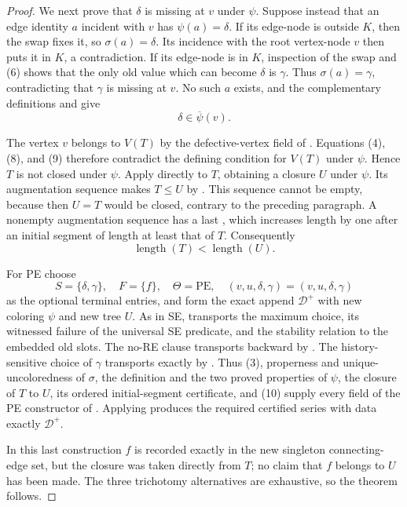 \begin{proof}
We next prove that \(\delta\) is missing at \(v\) under \(\psi\).
Suppose instead that an edge identity \(a\) incident with \(v\) has
\(\psi(a)=\delta\).  If its edge-node is outside \(K\), then the swap
fixes it, so \(\sigma(a)=\delta\).  Its incidence with the root
vertex-node \(v\) then puts it in \(K\), a contradiction.  If its
edge-node is in \(K\), inspection of the swap and (6) shows that the only
old value which can become \(\delta\) is \(\gamma\).  Thus
\(\sigma(a)=\gamma\), contradicting that \(\gamma\) is missing at
\(v\).  No such \(a\) exists, and the complementary definitions
 and  give
\[
                    \delta\in\overline\psi(v).                 \tag{9}
\]

The vertex \(v\) belongs to \(V(T)\) by the defective-vertex field of
.  Equations (4), (8), and (9) therefore
contradict the defining condition  for
\(V(T)\) under \(\psi\).  Hence \(T\) is not closed under \(\psi\).
Apply  directly to \(T\), obtaining a
closure \(U\) under \(\psi\).  Its augmentation sequence makes
\(T\leq U\) by
.  This sequence
cannot be empty, because then \(U=T\) would be closed, contrary to the
preceding paragraph.  A nonempty augmentation sequence has a last
, which increases length by one after an
initial segment of length at least that of \(T\).  Consequently
\[
                       \operatorname{length}(T)<\operatorname{length}(U).
                                                                    \tag{10}
\]

For PE choose
\[
 S=\{\delta,\gamma\},\quad F=\{f\},\quad
 \Theta=\mathrm{PE},\quad
 (v,u,\delta,\gamma)=(v,u,\delta,\gamma)
\]
as the optional terminal entries, and form the exact append
\(\mathcal D^+\) with new coloring \(\psi\) and new tree \(U\).
As in SE,  transports the maximum
choice, its witnessed failure of the universal SE predicate, and the
stability relation to the embedded old slots.  The no-RE clause transports
backward by .  The
history-sensitive choice of \(\gamma\) transports exactly by
.  Thus (3), properness and
unique-uncoloredness of \(\sigma\), the definition and the two proved
properties of \(\psi\), the closure of \(T\) to \(U\), its ordered
initial-segment certificate, and (10) supply every field of the PE
constructor of .  Applying
 produces the required certified series
with data exactly \(\mathcal D^+\).

In this last construction \(f\) is recorded exactly in the new singleton
connecting-edge set, but the closure was taken directly from \(T\); no
claim that \(f\) belongs to \(U\) has been made.  The three trichotomy
alternatives are exhaustive, so the theorem follows.
\end{proof}
